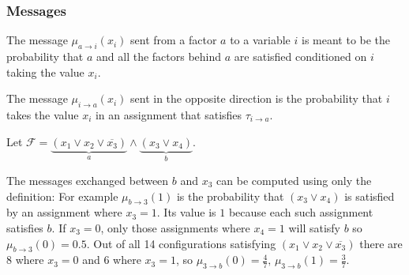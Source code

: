 \subsubsection{Messages}

The message $\mu_{a \rightarrow i}(x_i)$ sent from a factor $a$ to a variable $i$ is meant to be the probability that $a$ and all the factors behind $a$ are satisfied conditioned on $i$ taking the value $x_i$. 


The message $\mu_{i \rightarrow a}(x_i)$ sent in the opposite direction is the probability that $i$ takes the value $x_i$ in an assignment that satisfies $\tau_{i \rightarrow a}$.

\begin{example}
Let $\mathcal{F} = \underbrace{(x_1 \lor x_2 \lor \overline{x_3})}_a  \land \underbrace{(x_3 \lor x_4)}_b $.

\begin{figure}[h]
\centering

\end{figure}
The messages exchanged between $b$ and $x_3$ can be computed using only the definition: \newline
For example $\mu_{b \rightarrow 3}(1)$ is the probability that $(x_3 \lor x_4)$ is satisfied by an assignment where $x_3 = 1$. Its value is $1$ because each such assignment satisfies $b$. If $x_3 = 0$, only those assignments where $x_4 = 1$ will satisfy $b$ so $\mu_{b \rightarrow 3}(0) = 0.5$. \newline
Out of all 14 configurations satisfying $(x_1 \lor x_2 \lor \overline{x_3})$ there are $8$ where $x_3 = 0$ and $6$ where $x_3 = 1$, so $\mu_{3 \rightarrow b}(0) = \frac{4}{7}, \, \mu_{3 \rightarrow b}(1) = \frac{3}{7}$.
\end{example}

